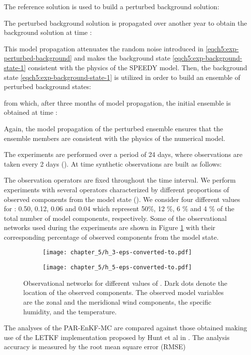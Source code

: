 \documentclass[12pt]{article}
\begin{document}
The reference solution  is used to build a perturbed background solution:

The perturbed background solution is propagated over another year to obtain the background solution at time :

This model propagation attenuates the random noise introduced in \eqref{eqch5:exp-perturbed-background} and makes the background state \eqref{eqch5:exp-background-state-1} consistent with the physics of the SPEEDY model. Then, the background state \eqref{eqch5:exp-background-state-1} is utilized in order to build an ensemble of perturbed background states:

from which, after three months of model propagation, the initial ensemble is obtained at time :

Again, the model propagation of the perturbed ensemble ensures that the ensemble members are consistent with the physics of the numerical model. 

The experiments are performed over a period of 24 days, where observations are taken every 2 days (). At time  synthetic observations are built as follows:

The observation operators  are fixed throughout the time interval. We perform experiments with several operators characterized by different  proportions  of observed components from the model state  (). We consider four different values for : 0.50, 0.12, 0.06 and 0.04 which represent 50\%, 12 \%, 6 \% and 4 \% of the total number of model components, respectively. Some of the observational networks used during the experiments are shown in Figure \ref{fig:exp-observational-grids} with their corresponding percentage of observed components from the model state. 
\begin{figure}[H]
\centering
\begin{subfigure}{0.5\textwidth}
\centering
\texttt{[image: chapter\_5/h\_3-eps-converted-to.pdf]}
\caption{ }
\end{subfigure}\begin{subfigure}{0.5\textwidth}
\centering
\texttt{[image: chapter\_5/h\_5-eps-converted-to.pdf]}
\caption{ }
\end{subfigure}\caption{Observational networks for different values of . Dark dots denote the location of the observed components. The observed model variables are the zonal and the meridional wind components, the specific humidity, and the temperature.}
\label{fig:exp-observational-grids}
\end{figure}
The analyses of the PAR-EnKF-MC are compared against those obtained making use of the LETKF implementation proposed by Hunt et al in \cite{terasaki2015local,TELA:TELA076,miyoshi2012local} . The analysis accuracy is measured by the root mean square error (RMSE)
\end{document}
